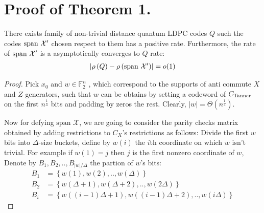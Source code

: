 \documentclass[manuscript,screen,review]{acmart}
\begin{document}
\section{Proof of Theorem 1.}
\begin{claim}
  \label{claim:notempty}
  There exists family of non-trivial distance quantum LDPC codes $Q$ such the codes $\text{span }\mathcal{X}^\prime$ chosen respect to them has a positive rate. Furthermore, the rate of $\text{span }\mathcal{X}^\prime$ is a asymptotically converges to $Q$ rate:
  \begin{equation*}
    \begin{split}
      \left| \rho\left(Q\right) - \rho\left(\text{span }\mathcal{X}^\prime\right) \right| = o(1)
    \end{split}
  \end{equation*}
\end{claim}
\begin{proof}
   Pick $x_{0}$ and $w \in \mathbb{F}_{2}^{n}$ , which correspond to the supports of anti commute $X$ and $Z$ generators, such that $w$ can be obtains by setting a codeword of $C_{\text{Tanner}}$ on the first $n^{\frac{1}{4}}$ bits and padding by zeros the rest. Clearly, $|w| = \Theta(n^{\frac{1}{4}})$.

  Now for defying $\text{span }\mathcal{X}$, we are going to consider the parity checks matrix obtained by adding restrictions to $C_{X}$'s restrictions as follows: Divide the first $w$ bits into $\Delta$-size buckets, define by $w(i)$ the $i$th coordinate on which $w$ isn't trivial. For example if $w(1)=j$ then $j$ is the first nonzero coordinate of $w$, Denote by $B_{1},B_2,.., B_{|w|/\Delta}$ the partion of $w$'s bits: 
  \begin{equation*}
    \begin{split}
      B_{1} &= \left\{w(1), w(2), ..,w(\Delta)\right\}\\
      B_{2} &= \left\{w(\Delta + 1), w(\Delta + 2), ..,w(2\Delta) \right\}\\
      B_{i} &= \left\{w((i-1)\Delta + 1), w((i-1)\Delta + 2), ..,w(i\Delta) \right\}
    \end{split}
  \end{equation*}


\end{proof}
\end{document}
